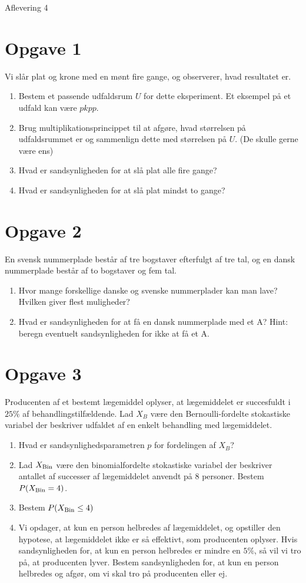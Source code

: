 
\begin{center}
\Huge
Aflevering 4
\end{center}
\section*{Opgave 1}
Vi slår plat og krone med en mønt fire gange, og observerer, hvad resultatet er.
\begin{enumerate}[label=\roman*)]
\item Bestem et passende udfaldsrum $U$ for dette eksperiment. Et eksempel på et udfald kan være $pkpp$.
\item Brug multiplikationsprincippet til at afgøre, hvad størrelsen på udfaldsrummet er og sammenlign dette med størrelsen på $U$. (De skulle gerne være ens)
\item Hvad er sandsynligheden for at slå plat alle fire gange?
\item Hvad er sandsynligheden for at slå plat mindst to gange?
\end{enumerate}
\section*{Opgave 2}
En svensk nummerplade består af tre bogstaver efterfulgt af tre tal, og en dansk nummerplade består af to bogstaver og fem tal. 
\begin{enumerate}[label=\roman*)]
\item Hvor mange forskellige danske og svenske nummerplader kan man lave? Hvilken giver flest muligheder?
\item Hvad er sandsynligheden for at få en dansk nummerplade med et A? Hint: beregn eventuelt sandsynligheden for ikke at få et A.
\end{enumerate}

\section*{Opgave 3}
Producenten af et bestemt lægemiddel oplyser, at lægemiddelet er succesfuldt i $25\%$ af behandlingstilfældende. Lad $X_B$ være den Bernoulli-fordelte stokastiske variabel der beskriver udfaldet af en enkelt behandling med lægemiddelet. 
\begin{enumerate}[label=\roman*)]
\item Hvad er sandsynlighedsparametren $p$ for fordelingen af $X_B$?
\item Lad $X_{\textnormal{Bin}}$ være den binomialfordelte stokastiske variabel der beskriver antallet af successer af lægemiddelet anvendt på $8$ personer. Bestem $P(X_{\textnormal{Bin}} = 4)$.
\item Bestem $P(X_{\textnormal{Bin}} \leq 4)$
\item Vi opdager, at kun en person helbredes af lægemiddelet, og opstiller den hypotese, at lægemiddelet ikke er så effektivt, som producenten oplyser. Hvis sandsynligheden for, at kun en person helbredes er mindre en $5\%$, så vil vi tro på, at producenten lyver. Bestem sandsynligheden for, at kun en person helbredes og afgør, om vi skal tro på producenten eller ej. 
\end{enumerate}

